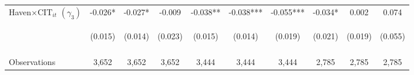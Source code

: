 \begin{center}
\begin{tabular}{lccccccccc}
Haven$\times\text{CIT}_{it}$ $ (\gamma_3)$ & -0.026* & -0.027* & -0.009 & -0.038** & -0.038*** & -0.055*** & -0.034* & 0.002 & 0.074 \\
 & \begin{footnotesize}(0.015)\end{footnotesize} & \begin{footnotesize}(0.014)\end{footnotesize} & \begin{footnotesize}(0.023)\end{footnotesize} & \begin{footnotesize}(0.015)\end{footnotesize} & \begin{footnotesize}(0.014)\end{footnotesize} & \begin{footnotesize}(0.019)\end{footnotesize} & \begin{footnotesize}(0.021)\end{footnotesize} & \begin{footnotesize}(0.019)\end{footnotesize} & \begin{footnotesize}(0.055)\end{footnotesize} \\
\vspace{4pt} & \begin{footnotesize}\end{footnotesize} & \begin{footnotesize}\end{footnotesize} & \begin{footnotesize}\end{footnotesize} & \begin{footnotesize}\end{footnotesize} & \begin{footnotesize}\end{footnotesize} & \begin{footnotesize}\end{footnotesize} & \begin{footnotesize}\end{footnotesize} & \begin{footnotesize}\end{footnotesize} & \begin{footnotesize}\end{footnotesize} \\
Observations & 3,652 & 3,652 & 3,652 & 3,444 & 3,444 & 3,444 & 2,785 & 2,785 & 2,785 \\

\end{tabular}
\end{center}
